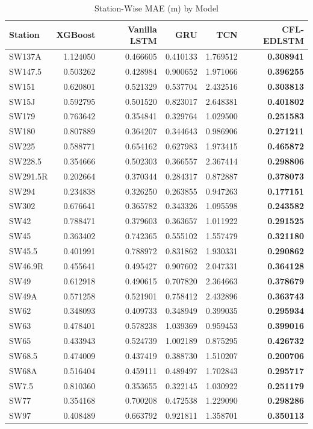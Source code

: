 \begin{table}[htbp]
  \centering
  \caption{Station-Wise MAE (m) by Model}
  \label{tab:4.2a}
  \small
  \begin{tabular}{@{}l r r r r >{\columncolor{gray!15}\bfseries}r@{}}
    \toprule
    \textbf{Station} & \textbf{XGBoost} & \textbf{Vanilla LSTM} & \textbf{GRU} & \textbf{TCN} & \textbf{CFL-EDLSTM} \\
    \midrule
    SW137A & 1.124050 & 0.466605 & 0.410133 & 1.769512 & 0.308941 \\
    SW147.5 & 0.503262 & 0.428984 & 0.900652 & 1.971066 & 0.396255 \\
    SW151 & 0.620801 & 0.521329 & 0.537704 & 2.432516 & 0.303813 \\
    SW15J & 0.592795 & 0.501520 & 0.823017 & 2.648381 & 0.401802 \\
    SW179 & 0.763642 & 0.354841 & 0.329764 & 1.029500 & 0.251583 \\
    SW180 & 0.807889 & 0.364207 & 0.344643 & 0.986906 & 0.271211 \\
    SW225 & 0.588771 & 0.654162 & 0.627983 & 1.973415 & 0.465872 \\
    SW228.5 & 0.354666 & 0.502303 & 0.366557 & 2.367414 & 0.298806 \\
    SW291.5R & 0.202664 & 0.370344 & 0.284317 & 0.872887 & 0.378073 \\
    SW294 & 0.234838 & 0.326250 & 0.263855 & 0.947263 & 0.177151 \\
    SW302 & 0.676641 & 0.365782 & 0.343326 & 1.095598 & 0.243582 \\
    SW42 & 0.788471 & 0.379603 & 0.363657 & 1.011922 & 0.291525 \\
    SW45 & 0.363402 & 0.742365 & 0.555102 & 1.557479 & 0.321180 \\
    SW45.5 & 0.401991 & 0.788972 & 0.831862 & 1.930331 & 0.290862 \\
    SW46.9R & 0.455641 & 0.495427 & 0.907602 & 2.047331 & 0.364128 \\
    SW49 & 0.612918 & 0.490615 & 0.707820 & 2.364663 & 0.378679 \\
    SW49A & 0.571258 & 0.521901 & 0.758412 & 2.432896 & 0.363743 \\
    SW62 & 0.348093 & 0.409733 & 0.348949 & 0.399035 & 0.295934 \\
    SW63 & 0.478401 & 0.578238 & 1.039369 & 0.959453 & 0.399016 \\
    SW65 & 0.433943 & 0.524739 & 1.002189 & 0.875295 & 0.426732 \\
    SW68.5 & 0.474009 & 0.437419 & 0.388730 & 1.510207 & 0.200706 \\
    SW68A & 0.516404 & 0.459111 & 0.489497 & 1.702843 & 0.295717 \\
    SW7.5 & 0.810360 & 0.353655 & 0.322145 & 1.030922 & 0.251179 \\
    SW77 & 0.354168 & 0.700208 & 0.472538 & 1.229090 & 0.298286 \\
    SW97 & 0.408489 & 0.663792 & 0.921811 & 1.358701 & 0.350113 \\
    \bottomrule
  \end{tabular}
\end{table}

